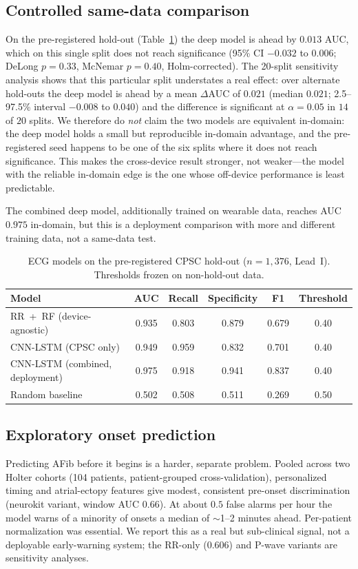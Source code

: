 \subsection{Controlled same-data comparison}
On the pre-registered hold-out (Table~\ref{tab:ecg}) the deep model is ahead by
$0.013$ AUC, which on this single split does not reach significance (95\% CI
$-0.032$ to $0.006$; DeLong $p{=}0.33$, McNemar $p{=}0.40$, Holm-corrected). The
20-split sensitivity analysis shows that this particular split understates a real
effect: over alternate hold-outs the deep model is ahead by a mean $\Delta$AUC of
$0.021$ (median $0.021$; 2.5--97.5\% interval $-0.008$ to $0.040$) and the
difference is significant at $\alpha{=}0.05$ in $14$ of $20$ splits. We therefore
do \emph{not} claim the two models are equivalent in-domain: the deep model holds
a small but reproducible in-domain advantage, and the pre-registered seed happens
to be one of the six splits where it does not reach significance. This makes the
cross-device result stronger, not weaker---the model with the reliable in-domain
edge is the one whose off-device performance is least predictable.

The combined deep model, additionally trained on wearable data, reaches AUC
$0.975$ in-domain, but this is a deployment comparison with more and different
training data, not a same-data test.

\begin{table}[t]
\centering
\caption{ECG models on the pre-registered CPSC hold-out ($n{=}1{,}376$, Lead~I).
Thresholds frozen on non-hold-out data.}
\label{tab:ecg}
\begin{tabular}{lccccc}
\toprule
Model & AUC & Recall & Specificity & F1 & Threshold \\
\midrule
RR~+~RF (device-agnostic) & 0.935 & 0.803 & 0.879 & 0.679 & 0.40 \\
CNN-LSTM (CPSC only) & 0.949 & 0.959 & 0.832 & 0.701 & 0.40 \\
CNN-LSTM (combined, deployment) & 0.975 & 0.918 & 0.941 & 0.837 & 0.40 \\
Random baseline & 0.502 & 0.508 & 0.511 & 0.269 & 0.50 \\
\bottomrule
\end{tabular}
\end{table}

\subsection{Exploratory onset prediction}
Predicting AFib before it begins is a harder, separate problem. Pooled across two
Holter cohorts (104 patients, patient-grouped cross-validation), personalized
timing and atrial-ectopy features give modest, consistent pre-onset discrimination
(neurokit variant, window AUC $0.66$). At about $0.5$ false alarms per hour the
model warns of a minority of onsets a median of $\sim$1--2 minutes ahead.
Per-patient normalization was essential. We report this as a real but sub-clinical
signal, not a deployable early-warning system; the RR-only ($0.606$) and P-wave
variants are sensitivity analyses.

